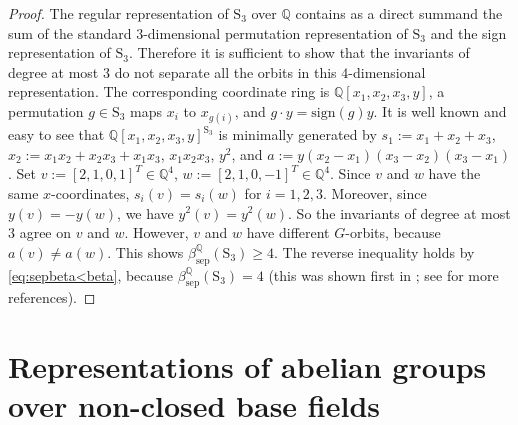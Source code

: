 \documentclass[12pt, oneside]{amsart}
\def\QQ{\mathbb{Q}}
\def\sepbeta{\beta_{\mathrm{sep}}}
\begin{document}
\begin{proof} 
The regular representation of $\mathrm{S}_3$ over $\QQ$ contains as a direct summand 
the sum of the standard $3$-dimensional permutation representation of  $\mathrm{S}_3$ 
and the sign representation of  $\mathrm{S}_3$. 
Therefore it is sufficient to show that the invariants of degree  at most $3$ do not separate all the orbits in this $4$-dimensional representation. 
The corresponding coordinate ring is $\QQ[x_1,x_2,x_3,y]$, a permutation $g\in \mathrm{S}_3$ maps $x_i$ to $x_{g(i)}$, and $g\cdot y=\mathrm{sign}(g)y$. 
It is well known and easy to see that 
$\QQ[x_1,x_2,x_3,y]^{\mathrm{S}_3}$ is minimally generated by 
$s_1:=x_1+x_2+x_3$, $x_2:=x_1x_2+x_2x_3+x_1x_3$, $x_1x_2x_3$, $y^2$, 
and $a:=y(x_2-x_1)(x_3-x_2)(x_3-x_1)$. 
Set $v:=[2,1,0,1]^T\in \QQ^4$, $w:= [2,1,0,-1]^T\in \QQ^4$. 
Since $v$ and $w$ have the same $x$-coordinates, $s_i(v)=s_i(w)$ for $i=1,2,3$. 
Moreover, since $y(v)=-y(w)$, we have $y^2(v)=y^2(w)$. So the invariants of degree at most $3$ agree 
on $v$ and $w$. 
However, $v$ and $w$ have different $G$-orbits, because $a(v)\neq a(w)$. This shows 
$\sepbeta^\QQ(\mathrm{S}_3)\ge 4$. 
The reverse inequality holds by \eqref{eq:sepbeta<beta}, because $\sepbeta^\QQ(\mathrm{S}_3)=4$ (this was shown first in 
\cite{schmid}; see \cite{cziszter-domokos-szollosi} for more references).    
\end{proof} 
 
\section{Representations of abelian groups over non-closed base fields}\label{sec:non-closed}
\end{document}
